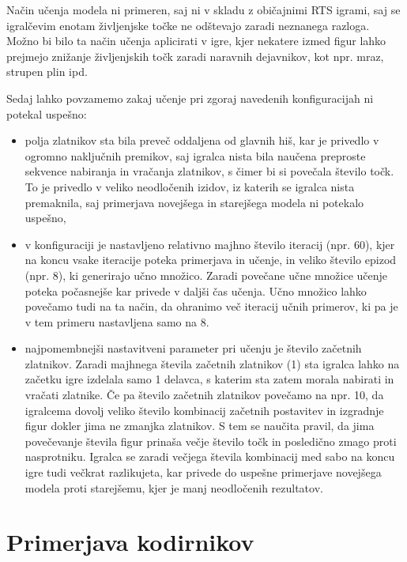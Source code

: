 \documentclass[a4paper, 12pt]{book}
\begin{document}
Način učenja modela ni primeren, saj ni v skladu z običajnimi RTS igrami, saj se igralčevim enotam življenjske točke ne odštevajo zaradi neznanega razloga.
Možno bi bilo ta način učenja aplicirati v igre, kjer nekatere izmed figur lahko prejmejo znižanje življenjskih točk zaradi naravnih dejavnikov, kot npr. mraz, strupen plin ipd.

Sedaj lahko povzamemo zakaj učenje pri zgoraj navedenih konfiguracijah ni potekal uspešno:
\begin{itemize}
	\item polja zlatnikov sta bila preveč oddaljena od glavnih hiš, kar je privedlo v ogromno naključnih premikov, saj igralca nista bila naučena preproste sekvence nabiranja in vračanja zlatnikov, s čimer bi si povečala število točk.
	To je privedlo v veliko neodločenih izidov, iz katerih se igralca nista premaknila, saj primerjava novejšega in starejšega modela ni potekalo uspešno,
	\item v konfiguraciji je nastavljeno relativno majhno število iteracij (npr. 60), kjer na koncu vsake iteracije poteka primerjava in učenje, in veliko število epizod (npr. 8), ki generirajo učno množico.
	Zaradi povečane učne množice učenje poteka počasnejše kar privede v daljši čas učenja. Učno množico lahko povečamo tudi na ta način, da ohranimo več iteracij učnih primerov, ki pa je v tem primeru nastavljena samo na 8.	
	\item najpomembnejši nastavitveni parameter pri učenju je število začetnih zlatnikov.
	Zaradi majhnega števila začetnih zlatnikov (1) sta igralca lahko na začetku igre izdelala samo 1 delavca, s katerim sta zatem morala nabirati in vračati zlatnike.
	Če pa število začetnih zlatnikov povečamo na npr. 10, da igralcema dovolj veliko število kombinacij začetnih postavitev in izgradnje figur dokler jima ne zmanjka zlatnikov.
	S tem se naučita pravil, da jima povečevanje števila figur prinaša večje število točk in posledično zmago proti nasprotniku.
	Igralca se zaradi večjega števila kombinacij med sabo na koncu igre tudi večkrat razlikujeta, kar privede do uspešne primerjave novejšega modela proti starejšemu, kjer je manj neodločenih rezultatov.
	
\end{itemize}

\section{Primerjava kodirnikov}
\end{document}

